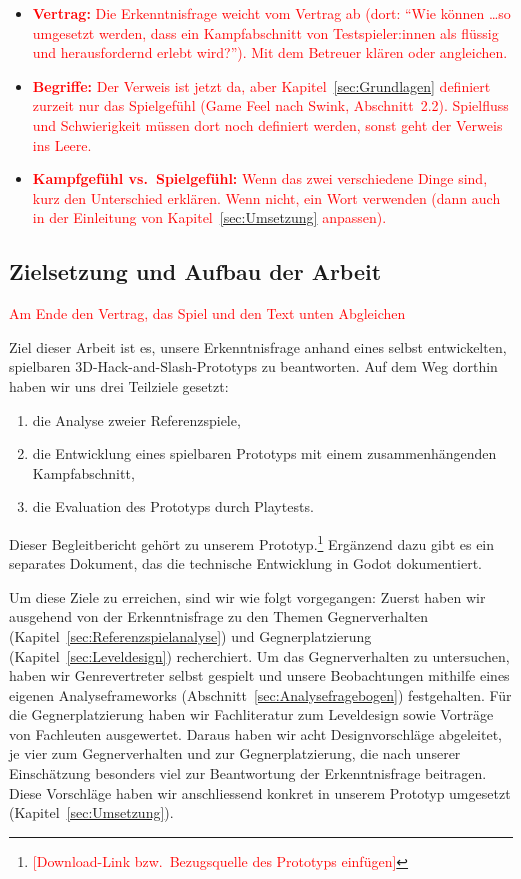 \documentclass[../Main.tex]{subfiles}
\begin{document}
\begin{itemize}[leftmargin=1.5cm]
    \item \textcolor{red}{\textbf{Vertrag:} Die Erkenntnisfrage weicht vom Vertrag ab (dort: \enquote{Wie können \ldots so umgesetzt werden, dass ein Kampfabschnitt von Testspieler:innen als flüssig und herausfordernd erlebt wird?}). Mit dem Betreuer klären oder angleichen.}
    \item \textcolor{red}{\textbf{Begriffe:} Der Verweis ist jetzt da, aber Kapitel~\ref{sec:Grundlagen} definiert zurzeit nur das Spielgefühl (Game Feel nach Swink, Abschnitt~2.2). Spielfluss und Schwierigkeit müssen dort noch definiert werden, sonst geht der Verweis ins Leere.}
    \item \textcolor{red}{\textbf{Kampfgefühl vs.\ Spielgefühl:} Wenn das zwei verschiedene Dinge sind, kurz den Unterschied erklären. Wenn nicht, ein Wort verwenden (dann auch in der Einleitung von Kapitel~\ref{sec:Umsetzung} anpassen).}
\end{itemize}

\subsection{Zielsetzung und Aufbau der Arbeit} \label{sec:Aufbau}

\textcolor{red}{Am Ende den Vertrag, das Spiel und den Text unten Abgleichen}

Ziel dieser Arbeit ist es, unsere Erkenntnisfrage anhand eines selbst entwickelten, spielbaren 3D-Hack-and-Slash-Prototyps zu beantworten. Auf dem Weg dorthin haben wir uns drei Teilziele gesetzt:

\begin{enumerate}
    \item die Analyse zweier Referenzspiele,
    \item die Entwicklung eines spielbaren Prototyps mit einem zusammenhängenden Kampfabschnitt,
    \item die Evaluation des Prototyps durch Playtests.
\end{enumerate}

Dieser Begleitbericht gehört zu unserem Prototyp.\footnote{\textcolor{red}{[Download-Link bzw.\ Bezugsquelle des Prototyps einfügen]}} Ergänzend dazu gibt es ein separates Dokument, das die technische Entwicklung in Godot dokumentiert.

Um diese Ziele zu erreichen, sind wir wie folgt vorgegangen: Zuerst haben wir ausgehend von der Erkenntnisfrage zu den Themen Gegnerverhalten (Kapitel~\ref{sec:Referenzspielanalyse}) und Gegnerplatzierung (Kapitel~\ref{sec:Leveldesign}) recherchiert. Um das Gegnerverhalten zu untersuchen, haben wir Genrevertreter selbst gespielt und unsere Beobachtungen mithilfe eines eigenen Analyseframeworks (Abschnitt~\ref{sec:Analysefragebogen}) festgehalten. Für die Gegnerplatzierung haben wir Fachliteratur zum Leveldesign sowie Vorträge von Fachleuten ausgewertet. Daraus haben wir acht Designvorschläge abgeleitet, je vier zum Gegnerverhalten und zur Gegnerplatzierung, die nach unserer Einschätzung besonders viel zur Beantwortung der Erkenntnisfrage beitragen. Diese Vorschläge haben wir anschliessend konkret in unserem Prototyp umgesetzt (Kapitel~\ref{sec:Umsetzung}).
\end{document}

